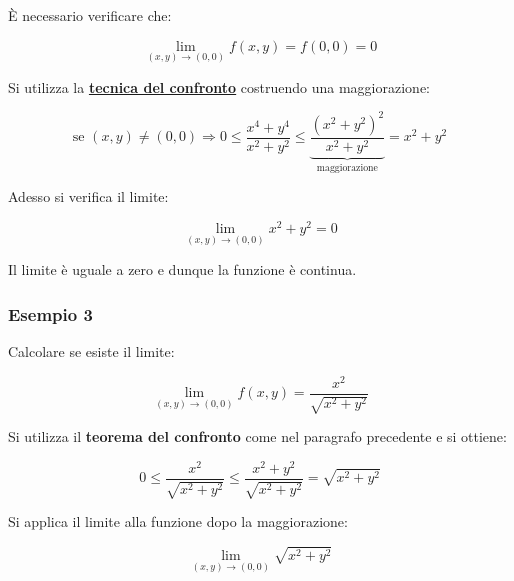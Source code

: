 \documentclass[a4paper]{article}
\begin{document}
	\noindent
	È necessario verificare che:
	
	\begin{equation*}
		\lim_{\left(x,y\right) \rightarrow \left(0,0\right)} f\left(x,y\right) = f\left(0,0\right) = 0
	\end{equation*}

	\noindent
	Si utilizza la \textcolor{Red3}{\textbf{\underline{tecnica del confronto}}} costruendo una maggiorazione:
	
	\begin{equation*}
		\text{se } \left(x,y\right) \ne \left(0,0\right) \Longrightarrow 0 \le \dfrac{x^{4} + y^{4}}{x^{2} + y^{2}} \le \underbrace{\dfrac{\left(x^{2} + y^{2}\right)^{2}}{x^{2} + y^{2}}}_{\text{maggiorazione}} = x^{2} + y^{2}
	\end{equation*}

	\noindent
	Adesso si verifica il limite:
	
	\begin{equation*}
		\lim_{\left(x,y\right) \rightarrow \left(0,0\right)} x^{2} + y^{2} = 0
	\end{equation*}

	\noindent
	Il limite è uguale a zero e dunque la funzione è continua.
	
	\newpage
	
	\subsubsection[Esempio 3]{\textcolor{Green4}{Esempio 3}}
	
	Calcolare se esiste il limite:
	
	\begin{equation*}
		\lim_{\left(x,y\right) \rightarrow \left(0,0\right)} f\left(x,y\right) = \dfrac{x^{2}}{\sqrt{x^{2} + y^{2}}}
	\end{equation*}

	\noindent
	Si utilizza il \textbf{teorema del confronto} come nel paragrafo precedente e si ottiene:
	
	\begin{equation*}
		0 \le \dfrac{x^{2}}{\sqrt{x^{2} + y^{2}}} \le \dfrac{x^{2} + y^{2}}{\sqrt{x^{2} + y^{2}}} = \sqrt{x^{2} + y^{2}}
	\end{equation*}

	\noindent
	Si applica il limite alla funzione dopo la maggiorazione:
	
	\begin{equation*}
		\lim_{\left(x,y\right) \rightarrow \left(0,0\right)} \sqrt{x^{2} + y^{2}}
	\end{equation*}
\end{document}

